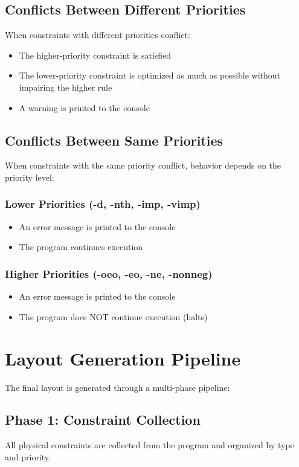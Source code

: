 \documentclass{report}
\begin{document}
\subsection{Conflicts Between Different Priorities}
When constraints with different priorities conflict:
\begin{itemize}
\item The higher-priority constraint is satisfied
\item The lower-priority constraint is optimized as much as possible without impairing the higher rule
\item A warning is printed to the console
\end{itemize}

\subsection{Conflicts Between Same Priorities}
When constraints with the same priority conflict, behavior depends on the priority level:

\subsubsection{Lower Priorities (-d, -nth, -imp, -vimp)}
\begin{itemize}
\item An error message is printed to the console
\item The program continues execution
\end{itemize}

\subsubsection{Higher Priorities (-oeo, -eo, -ne, -nonneg)}
\begin{itemize}
\item An error message is printed to the console
\item The program does NOT continue execution (halts)
\end{itemize}

\section{Layout Generation Pipeline}
The final layout is generated through a multi-phase pipeline:

\subsection{Phase 1: Constraint Collection}
All physical constraints are collected from the program and organized by type and priority.
\end{document}
